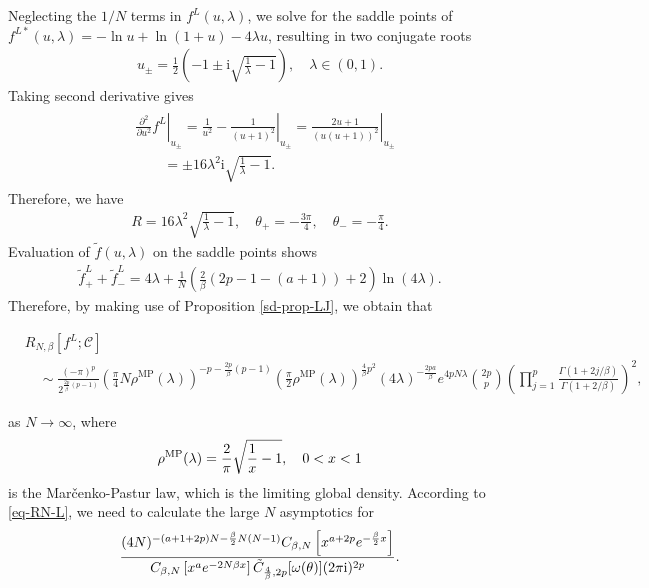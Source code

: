\documentclass[11pt,a4paper]{article}
\numberwithin{equation}{section} %
\theoremstyle{plain}
\theoremstyle{definition}
\numberwithin{prop}{section}
\numberwithin{cor}{section}
\numberwithin{remark}{section}
\begin{document}
Neglecting the $1/N$ terms in $f^L(u,\lambda)$, we solve for the saddle points of $f^{L*}(u,\lambda)=-\ln u+\ln (1+u)-4 \lambda u$, resulting in two conjugate roots
\begin{align*}
    u_{ \pm}=\frac{1}{2}\left(-1 \pm \mathrm{i} \sqrt{\frac{1}{\lambda}-1}\right) ,\quad\lambda \in(0,1).
\end{align*}
Taking second derivative gives
\begin{align*}
\begin{aligned}
& \left.\frac{\partial^2}{\partial u^2} f^L\right|_{u_{ \pm}}=\frac{1}{u^2}-\left.\frac{1}{(u+1)^2}\right|_{u_{ \pm}} =\left.\frac{2 u+1}{(u(u+1))^2}\right|_{u_{ \pm}}\\
& \qquad = \pm 16 \lambda^2 \mathrm{i}\sqrt{\frac{1}{\lambda}-1}.
\end{aligned}
\end{align*}
Therefore, we have
\begin{align*}
    R=16 \lambda^2 \sqrt{\frac{1}{\lambda}-1}, \quad \theta_{+}=-\frac{3 \pi}{4},\quad \theta_-=-\frac{\pi}{4}.
\end{align*}
Evaluation of $\tilde{f}(u,\lambda)$ on the saddle points shows
\begin{align*}
    \tilde{f}^L_{+}+\tilde{f}^L_{-}=4 \lambda+\frac{1}{N}\left(\frac{2}{\beta}(2 p-1-(a+1))+2\right) \ln (4 \lambda).
\end{align*}
Therefore, by making use of Proposition \ref{sd-prop-LJ}, we obtain that 
\begin{small}
    \begin{align*}
    &R_{N, \beta}[f^L;\mathcal{C}]\nonumber\\
    &\quad\sim \frac{{(-\pi)}^p}{2^{\frac{2 p}{\beta}(p-1)}}\left(\frac{\pi}{4} N \rho^{\mathrm{MP}}(\lambda)\right)^{-p- \frac{2p}{\beta} (p-1)} \left(\frac{\pi}{2} \rho^{\mathrm{MP}}(\lambda)\right)^{\frac{4}{\beta} p^2}(4 \lambda)^{-\frac{2 pa}{\beta}}e^{4 p N \lambda}  \binom{2p}{p} \left(\prod_{j=1}^p \frac{\Gamma(1+2 j / \beta)}{\Gamma(1+2 / \beta)}\right)^2,
\end{align*}
\end{small}
as $N\to \infty$, where 
\begin{align}\label{Mar-Pas-law}
    \rho^{\mathrm{MP}}(\lambda)={2\over \pi}\sqrt{{1\over x}-1}, \quad 0<x<1
\end{align}
is the Mar\v{c}enko-Pastur law, which is the limiting global density. According to \eqref{eq-RN-L}, we need to calculate the large $N$ asymptotics for 
\begin{align*}
\frac{(4 N)^{-(a+1+2 p) N-\frac{\beta}{2} N(N-1)}  C_{\beta, N}\left[x^{a+2 p} e^{-\frac{\beta}{2} x}\right]}{C_{\beta, N}\left[x^a e^{-2 N \beta x}\right]\tilde{C}_{{4\over\beta},2p}[\omega(\theta)](2\pi\mathrm{i})^{2p}}.
\end{align*}
\end{document}
